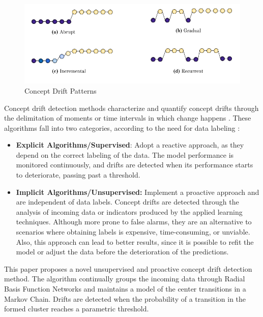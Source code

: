 \documentclass[preprint,12pt]{elsarticle}
\begin{document}
\begin{figure}[h!]
\begin{center}
    \includegraphics[scale=0.7]{img/concept_drift_patterns.png}
    \caption{Concept Drift Patterns}
    \label{fig:concept_drift_patterns}
\end{center}
\end{figure}

Concept drift detection methods characterize and quantify concept drifts through the delimitation of moments or time intervals in which change happens \cite{Basseville:1993:DAC:151741}.
%
These algorithms fall into two categories, according to the need for data labeling \cite{Zliobaite:2010}:

\begin{itemize}
    \item \textbf{Explicit Algorithms/Supervised}: Adopt a reactive approach, as they depend on the correct labeling of the data.
    The model performance is monitored continuously, and drifts are detected when its performance starts to deteriorate, passing past a threshold.
    \item \textbf{Implicit Algorithms/Unsupervised:} Implement a proactive approach and are independent of data labels.
    Concept drifts are detected through the analysis of incoming data or indicators produced by the applied learning techniques.
    Although more prone to false alarms, they are an alternative to scenarios where obtaining labels is expensive, time-consuming, or unviable.
    Also, this approach can lead to better results, since it is possible to refit the model or adjust the data before the deterioration of the predictions.
\end{itemize}

This paper proposes a novel unsupervised and proactive concept drift detection method.
The algorithm continually groups the incoming data through Radial Basis Function Networks and maintains a model of the center transitions in a Markov Chain.
Drifts are detected when the probability of a transition in the formed cluster reaches a parametric threshold.
\end{document}
